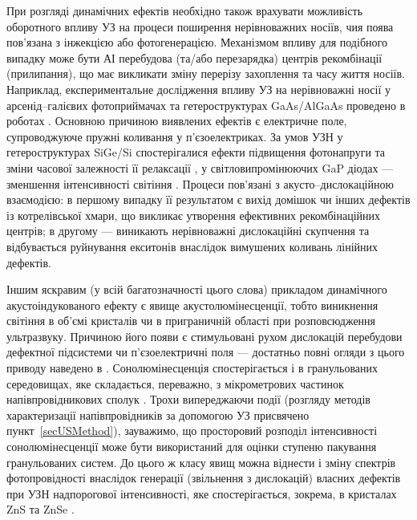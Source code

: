 При розгляді динамічних ефектів необхідно також врахувати можливість оборотного впливу УЗ на процеси поширення нерівноважних носіїв, чия поява пов'язана з інжекцією або фотогенерацією.
Механізмом впливу для подібного випадку може  бути АІ перебудова (та/або перезарядка)  центрів рекомбінації (прилипання), що має викликати зміну перерізу захоплення та часу життя носіїв.
Наприклад, експериментальне дослідження впливу УЗ на нерівноважні носії у арсенід--галієвих фотоприймачах та гетероструктурах GaAs/AlGaAs проведено в роботах \cite{Zaveryukhin2002:2,Olikh:Visn2007}.
Основною причиною виявлених ефектів є електричне поле, супроводжуюче пружні коливання у п'єзоелектриках.
За умов УЗН у гетероструктурах SiGe/Si спостерігалися ефекти підвищення фотонапруги та зміни часової залежності її релаксації  \cite{Ostrovskii2001,Kuryliuk2009},
у світловипромінюючих GaP  діодах  --- зменшення інтенсивності світіння \cite{USL:GaP}.
Процеси пов'язані з акусто--дислокаційною взаємодією:
в першому випадку її результатом є вихід домішок чи інших дефектів із котрелівської хмари, що викликає утворення ефективних рекомбінаційних центрів;
в другому --- виникають нерівноважні дислокаційні скупчення та відбувається руйнування екситонів внаслідок вимушених коливань лінійних дефектів.

Іншим яскравим (у всій багатозначності цього слова) прикладом
динамічного акустоіндукованого ефекту
є явище акустолюмінесценції, тобто виникнення світіння в об'ємі  кристалів чи в приграничній області при розповсюдження ультразвуку.
Причиною його появи є стимульовані рухом дислокацій перебудови дефектної підсистеми чи п'єзоелектричні поля ---
достатньо повні огляди з цього приводу наведено в \cite{OstrBook,OSTROVSKII1999}.
Сонолюмінесценція спостерігається і в гранульованих середовищах, яке складається, переважно, з мікрометрових частинок напівпровідникових сполук \cite{KorotRep}.
Трохи випереджаючи події (розгляду методів характеризації напівпровідників за допомогою УЗ присвячено пункт~\ref{secUSMethod}),
зауважимо, що просторовий розподіл інтенсивності сонолюмінесценції може бути використаний для оцінки ступеню пакування гранульованих систем\cite{KorotZnSdens}.
До цього ж класу явищ можна віднести і зміну спектрів фотопровідності внаслідок генерації (звільнення з дислокацій) власних дефектів при УЗН надпорогової інтенсивності, яке спостерігається, зокрема, в кристалах ZnS та ZnSe \cite{OSTROVSKII1992,OSTROVSKII1999}.

